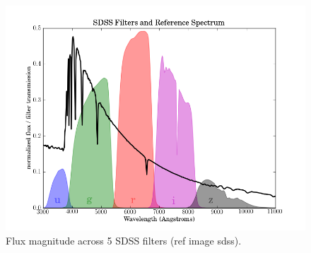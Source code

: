\begin{figure}[H]
	\centering
	\includegraphics[width=\linewidth,keepaspectratio]{images/misc/sdss_filters.png}
	\caption{Flux magnitude across 5 SDSS filters (ref image sdss).}
	\label{fig:ugriz}
\end{figure}

